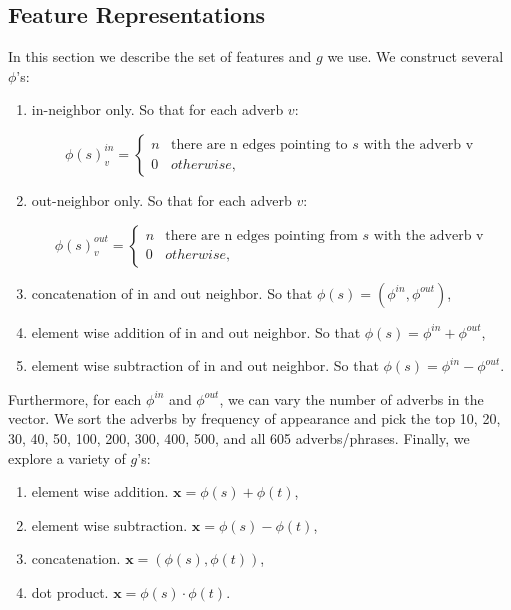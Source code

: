\subsection{Feature Representations}

In this section we describe the set of features and $g$ we use. We construct several $\phi$'s:

\begin{enumerate}
	\item in-neighbor only. So that for each adverb $v$:

		\[   
		\phi(s)^{in}_v = \left\{
		\begin{array}{ll}
		      n & \text{there are n edges pointing to $s$ with the adverb v} \\
		      0 & otherwise,
		\end{array} 
		\right.
		\]

	\item out-neighbor only. So that for each adverb $v$:

		\[   
		\phi(s)^{out}_v = \left\{
		\begin{array}{ll}
		      n & \text{there are n edges pointing from $s$ with the adverb v} \\
		      0 & otherwise,
		\end{array} 
		\right. 
		\]

	\item concatenation of in and out neighbor. So that $\phi(s) = (\phi^{in}, \phi^{out})$,

	\item element wise addition of in and out neighbor. So that $\phi(s) = \phi^{in} + \phi^{out}$,
	
	\item element wise subtraction of in and out neighbor. So that $\phi(s) = \phi^{in} - \phi^{out}$.

\end{enumerate}

Furthermore, for each $\phi^{in}$ and $\phi^{out}$, we can vary the number of adverbs in the vector. We sort the adverbs by frequency of appearance and pick the top 10, 20, 30, 40, 50, 100, 200, 300, 400, 500, and all 605 adverbs/phrases. Finally, we explore a variety of $g$'s:

\begin{enumerate}
	\item element wise addition. $\pmb{x} = \phi(s) + \phi(t)$,
	\item element wise subtraction. $\pmb{x} = \phi(s) - \phi(t)$,
	\item concatenation. $\pmb{x} = (\phi(s), \phi(t))$,
	\item dot product. $\pmb{x} = \phi(s) \cdot \phi(t)$.
\end{enumerate}


